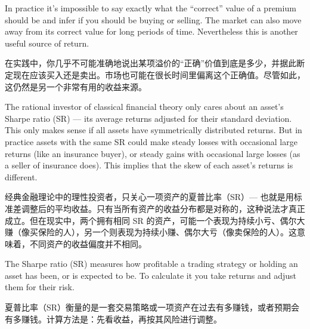 \bipairgap

\begin{englishblock} In practice it's impossible to say exactly what the ``correct'' value of a premium should be and infer if you should be buying or selling. The market can also move away from its correct value for long periods of time. Nevertheless this is another useful source of return. \end{englishblock}

\begin{chineseblock}在实践中，你几乎不可能准确地说出某项溢价的“正确”价值到底是多少，并据此断定现在应该买入还是卖出。市场也可能在很长时间里偏离这个正确值。尽管如此，这仍然是另一个非常有用的收益来源。\end{chineseblock}


\begin{englishblock} The rational investor of classical financial theory only cares about an asset's Sharpe ratio (SR) --- its average returns adjusted for their standard deviation. This only makes sense if all assets have symmetrically distributed returns. But in practice assets with the same SR could make steady losses with occasional large returns (like an insurance buyer), or steady gains with occasional large losses (as a seller of insurance does). This implies that the skew of each asset's returns is different. \end{englishblock}

\begin{chineseblock}经典金融理论中的理性投资者，只关心一项资产的夏普比率（SR）--- 也就是用标准差调整后的平均收益。只有当所有资产的收益分布都是对称的，这种说法才真正成立。但在现实中，两个拥有相同 SR 的资产，可能一个表现为持续小亏、偶尔大赚（像买保险的人），另一个则表现为持续小赚、偶尔大亏（像卖保险的人）。这意味着，不同资产的收益偏度并不相同。\end{chineseblock}


\begin{englishblock} The Sharpe ratio (SR) measures how profitable a trading strategy or holding an asset has been, or is expected to be. To calculate it you take returns and adjust them for their risk. \end{englishblock}

\begin{chineseblock}夏普比率（SR）衡量的是一套交易策略或一项资产在过去有多赚钱，或者预期会有多赚钱。计算方法是：先看收益，再按其风险进行调整。\end{chineseblock}

